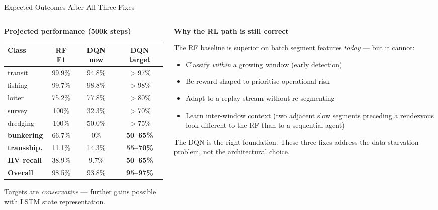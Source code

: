 \documentclass[aspectratio=169,10pt]{beamer}
\begin{document}
\begin{frame}{Expected Outcomes After All Three Fixes}
  \begin{columns}[T]
    \begin{column}{0.50\textwidth}
      \textbf{Projected performance (500k steps)}

      \medskip
      \begin{tabular}{lccc}
        \toprule
        Class & RF F1 & DQN now & DQN target \\
        \midrule
        transit & 99.9\% & 94.8\% & $>$97\% \\
        fishing & 99.7\% & 98.8\% & $>$98\% \\
        loiter & 75.2\% & 77.8\% & $>$80\% \\
        survey & 100\% & 32.3\% & $>$70\% \\
        dredging & 100\% & 50.0\% & $>$75\% \\
        \textbf{bunkering} & 66.7\% & \alert{0\%} & \textbf{50–65\%} \\
        \textbf{transship.} & 11.1\% & 14.3\% & \textbf{55–70\%} \\
        \midrule
        \textbf{HV recall} & 38.9\% & \alert{9.7\%} & \textbf{50–65\%} \\
        \textbf{Overall} & 98.5\% & 93.8\% & \textbf{95–97\%} \\
        \bottomrule
      \end{tabular}

      \bigskip
      {\small Targets are \emph{conservative} — further gains possible
      with LSTM state representation.}
    \end{column}
    \begin{column}{0.47\textwidth}
      \textbf{Why the RL path is still correct}

      \bigskip
      The RF baseline is superior on batch segment features \emph{today}
      — but it cannot:

      \medskip
      \begin{itemize}
        \item Classify \emph{within} a growing window (early detection)
        \item Be reward-shaped to prioritise operational risk
        \item Adapt to a replay stream without re-segmenting
        \item Learn inter-window context (two adjacent slow segments
              preceding a rendezvous look different to the RF than
              to a sequential agent)
      \end{itemize}

      \bigskip
      The DQN is the right foundation. These three fixes address the
      data starvation problem, not the architectural choice.
    \end{column}
  \end{columns}
\end{frame}
\end{document}
